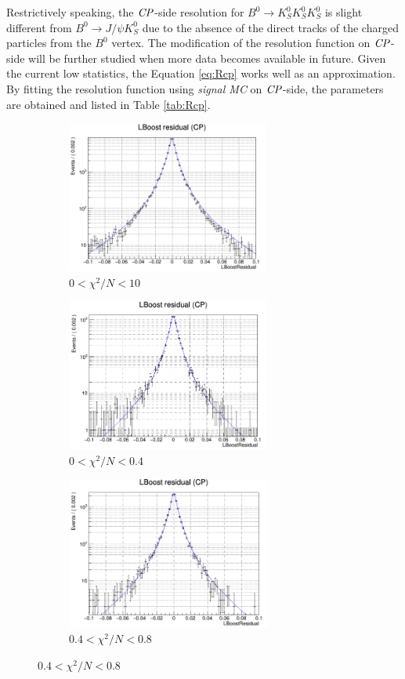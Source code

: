 Restrictively speaking, the $\it{CP}$-side resolution for $B^0 \to K_S^0  K_S^0  K_S^0$ is slight different from $B^0\to J/\psi K_S^0$ due to the absence of the direct tracks of the charged particles from the $B^0$ vertex. The modification of the resolution function on $\it{CP}$-side will be further studied when more data becomes available in future. Given the current low statistics, the Equation \ref{eq:Rcp} works well as an approximation. By fitting the resolution function using \textit{signal MC} on $\it{CP}$-side, the parameters are obtained and listed in Table \ref{tab:Rcp}.
\begin{figure}[htbp]
	\begin{subfigure}{0.5\linewidth}
		\caption{$0<\chi^2/N<10$}
		\includegraphics[height=5cm]{figures/residual0_10}	
	\end{subfigure}
	\begin{subfigure}{0.5\linewidth}
		\caption{$0<\chi^2/N<0.4$}
		\includegraphics[height=5cm]{figures/residual0_0.4}
	\end{subfigure}
	\begin{subfigure}{0.5\linewidth}
		\caption{$0.4<\chi^2/N<0.8$}
		\includegraphics[height=5cm]{figures/residual0.4_0.8}

\end{subfigure}
\end{figure}
